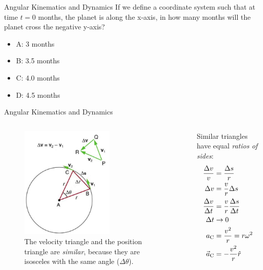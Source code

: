 \documentclass{beamer}
\begin{document}
\begin{frame}{Angular Kinematics and Dynamics}
If we define a coordinate system such that at time $t = 0$ months, the planet is along the x-axis, in how many months will the planet cross the negative y-axis?
\begin{itemize}
\item A: 3 months
\item B: 3.5 months
\item C: 4.0 months
\item D: 4.5 months
\end{itemize}
\end{frame}

\begin{frame}{Angular Kinematics and Dynamics}
\begin{columns}[T]
\begin{column}{0.5\textwidth}
\begin{figure}
\includegraphics[width=0.6\textwidth]{figures/circle2.png}
\caption{\label{fig:circle3} \small The velocity triangle and the position triangle are \textit{similar}, because they are isosceles with the same angle ($\Delta\theta$).}
\end{figure}
\end{column}
\begin{column}{0.5\textwidth}
\centering
Similar triangles have equal \textit{ratios of sides}:
\begin{align}
\frac{\Delta v}{v} &= \frac{\Delta s}{r} \\
\Delta v &= \frac{v}{r}\Delta s \\
\frac{\Delta v}{\Delta t} &= \frac{v}{r}\frac{\Delta s}{\Delta t} \\
\Delta t &\to 0 \\
a_{\rm C} &= \frac{v^2}{r} = r \omega^2 \\
\vec{a}_{\rm C} &= - \frac{v^2}{r} \hat{r}
\end{align}
\end{column}
\end{columns}
\end{frame}
\end{document}
